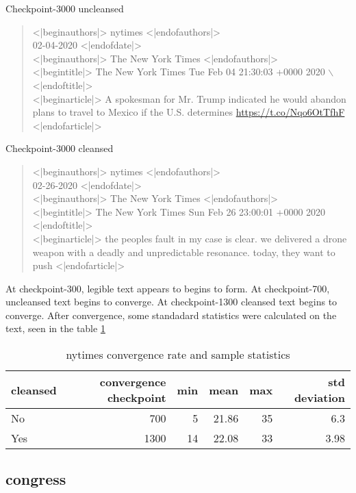 \documentclass[11pt]{article}
\begin{document}
\noindent 
Checkpoint-3000 uncleansed 

\begin{quote}
<|beginauthors|> nytimes <|endofauthors|>  \\
02-04-2020 <|endofdate|> \\
<|beginauthors|>  The New York Times <|endofauthors|> \\
<|begintitle|> The New York Times Tue Feb 04 21:30:03 +0000 2020 $\backslash$<|endoftitle|> \\
<|beginarticle|>  A spokesman for Mr. Trump indicated he would abandon plans to travel to Mexico if the U.S. determines \url{https://t.co/Nqo6OtTfhF} <|endofarticle|>
\end{quote}

\noindent 
Checkpoint-3000 cleansed 

\begin{quote}
<|beginauthors|> nytimes <|endofauthors|> \\
02-26-2020 <|endofdate|> \\
<|beginauthors|>  The New York Times <|endofauthors|> \\
<|begintitle|>  The New York Times Sun Feb 26 23:00:01 +0000 2020 <|endoftitle|> \\
<|beginarticle|>  the peoples fault in my case is clear. we delivered a drone weapon with a deadly and unpredictable resonance. today, they want to push <|endofarticle|>
\end{quote}


At checkpoint-300, legible text appears to begins to form. At checkpoint-700, uncleansed text begins to converge. 
At checkpoint-1300 cleansed text begins to converge. After convergence, some standadard statistics were
calculated on the text, seen in the table \ref{converge_ckpt}

\begin{table}[htbp]
\caption{nytimes convergence rate and sample statistics \label{converge_ckpt}}
\centering
\begin{tabular}{lrrrrr}
\hline
cleansed & convergence checkpoint & min & mean & max & std deviation\\
\hline
No & 700 & 5 & 21.86 & 35 & 6.3\\
Yes & 1300 & 14 & 22.08 & 33 & 3.98\\
\hline
\end{tabular}
\end{table}

\subsection{congress}
\label{sec:org8cf8a7e}
\end{document}
